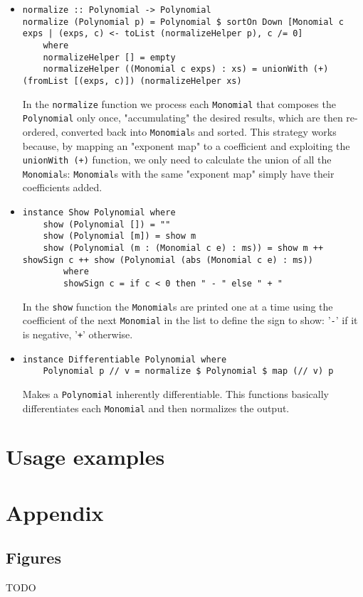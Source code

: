 \documentclass[11pt,a4paper]{article}
\begin{document}
\begin{itemize}
    \item \begin{lstlisting}
normalize :: Polynomial -> Polynomial
normalize (Polynomial p) = Polynomial $ sortOn Down [Monomial c exps | (exps, c) <- toList (normalizeHelper p), c /= 0]
    where
    normalizeHelper [] = empty
    normalizeHelper ((Monomial c exps) : xs) = unionWith (+) (fromList [(exps, c)]) (normalizeHelper xs)    
    \end{lstlisting}

    In the \lstinline{normalize} function we process each \lstinline{Monomial} that composes the \lstinline{Polynomial} only once, "accumulating" the desired results, which are then re-ordered, converted back into \lstinline{Monomial}s and sorted. This strategy works because, by mapping an "exponent map" to a coefficient and exploiting the \lstinline{unionWith (+)} function, we only need to calculate the union of all the \lstinline{Monomial}s: \lstinline{Monomial}s with the same "exponent map" simply have their coefficients added.

    \item \begin{lstlisting}
instance Show Polynomial where
    show (Polynomial []) = ""
    show (Polynomial [m]) = show m
    show (Polynomial (m : (Monomial c e) : ms)) = show m ++ showSign c ++ show (Polynomial (abs (Monomial c e) : ms))
        where
        showSign c = if c < 0 then " - " else " + "
    \end{lstlisting}

    In the \lstinline{show} function the \lstinline{Monomial}s are printed one at a time using the coefficient of the next \lstinline{Monomial} in the list to define the sign to show: '\lstinline{-}' if it is negative, '\lstinline{+}' otherwise.
    
    \item \begin{lstlisting}
instance Differentiable Polynomial where
    Polynomial p // v = normalize $ Polynomial $ map (// v) p
    \end{lstlisting}

    Makes a \lstinline{Polynomial} inherently differentiable. This functions basically differentiates each \lstinline{Monomial} and then normalizes the output.
\end{itemize}
    
\section{Usage examples}

\pagebreak

\appendix
\section{Appendix}

\subsection{Figures}

TODO
\end{document}
